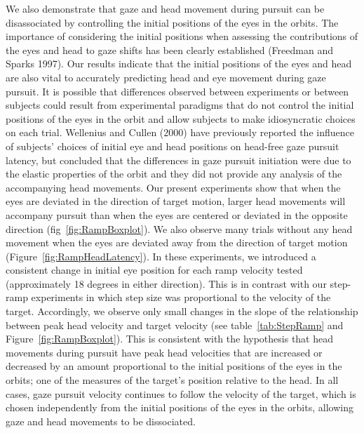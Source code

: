 \documentclass[12pt]{article}
\begin{document}
We also demonstrate that gaze and head movement during pursuit can be disassociated by controlling the initial positions of the eyes in the orbits. The importance of considering the initial positions when assessing the contributions of the eyes and head to gaze shifts has been clearly established (Freedman and Sparks 1997).  Our results indicate that the initial positions of the eyes and head are also vital to accurately predicting head and eye movement during gaze pursuit. It is possible that differences observed between experiments or between subjects could result from experimental paradigms that do not control the initial positions of the eyes in the orbit and allow subjects to make idiosyncratic choices on each trial. Wellenius and Cullen (2000) have previously reported the influence of subjects' choices of initial eye and head positions on head-free gaze pursuit latency, but concluded that the differences in gaze pursuit initiation were due to the elastic properties of the orbit and they did not provide any analysis of the accompanying head movements. Our present experiments show that when the eyes are deviated in the direction of target motion, larger head movements will accompany pursuit than when the eyes are centered or deviated in the opposite direction (fig~\ref{fig:RampBoxplot}). We also observe many trials without any head movement when the eyes are deviated away from the direction of target motion (Figure~\ref{fig:RampHeadLatency}).  In these experiments, we introduced a consistent change in initial eye position for each ramp velocity tested (approximately 18 degrees in either direction). This is in contrast with our step-ramp experiments in which step size was proportional to the velocity of the target. Accordingly, we observe only small changes in the slope of the relationship between peak head velocity and target velocity (see table~\ref{tab:StepRamp} and Figure~\ref{fig:RampBoxplot}). This is consistent with the hypothesis that head movements during pursuit have peak head velocities that are increased or decreased by an amount proportional to the initial positions of the eyes in the orbits; one of the measures of the target's position relative to the head. In all cases, gaze pursuit velocity continues to follow the velocity of the target, which is chosen independently from the initial positions of the eyes in the orbits, allowing gaze and head movements to be dissociated. 
\end{document}
